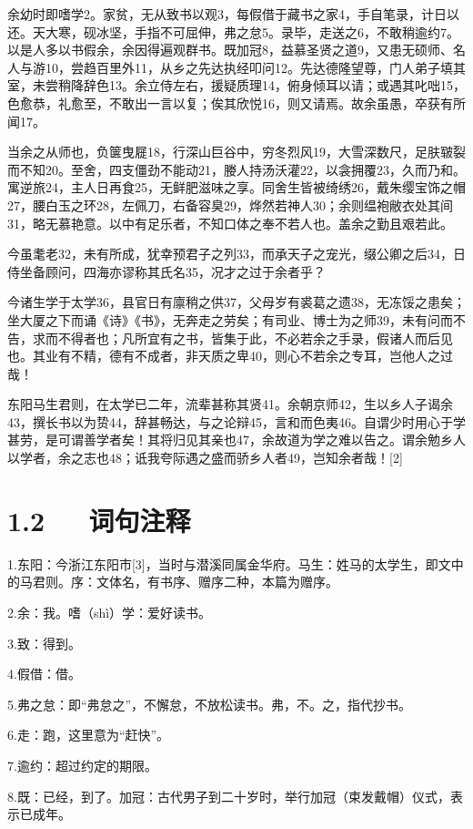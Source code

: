 \documentclass[letterpaper,10pt,english]{sphinxmanual}
\begin{document}
余幼时即嗜学2。家贫，无从致书以观3，每假借于藏书之家4，手自笔录，计日以还。天大寒，砚冰坚，手指不可屈伸，弗之怠5。录毕，走送之6，不敢稍逾约7。以是人多以书假余，余因得遍观群书。既加冠8，益慕圣贤之道9，又患无硕师、名人与游10，尝趋百里外11，从乡之先达执经叩问12。先达德隆望尊，门人弟子填其室，未尝稍降辞色13。余立侍左右，援疑质理14，俯身倾耳以请；或遇其叱咄15，色愈恭，礼愈至，不敢出一言以复；俟其欣悦16，则又请焉。故余虽愚，卒获有所闻17。

当余之从师也，负箧曳屣18，行深山巨谷中，穷冬烈风19，大雪深数尺，足肤皲裂而不知20。至舍，四支僵劲不能动21，媵人持汤沃灌22，以衾拥覆23，久而乃和。寓逆旅24，主人日再食25，无鲜肥滋味之享。同舍生皆被绮绣26，戴朱缨宝饰之帽27，腰白玉之环28，左佩刀，右备容臭29，烨然若神人30；余则缊袍敝衣处其间31，略无慕艳意。以中有足乐者，不知口体之奉不若人也。盖余之勤且艰若此。

今虽耄老32，未有所成，犹幸预君子之列33，而承天子之宠光，缀公卿之后34，日侍坐备顾问，四海亦谬称其氏名35，况才之过于余者乎？

今诸生学于太学36，县官日有廪稍之供37，父母岁有裘葛之遗38，无冻馁之患矣；坐大厦之下而诵《诗》《书》，无奔走之劳矣；有司业、博士为之师39，未有问而不告，求而不得者也；凡所宜有之书，皆集于此，不必若余之手录，假诸人而后见也。其业有不精，德有不成者，非天质之卑40，则心不若余之专耳，岂他人之过哉！

东阳马生君则，在太学已二年，流辈甚称其贤41。余朝京师42，生以乡人子谒余43，撰长书以为贽44，辞甚畅达，与之论辩45，言和而色夷46。自谓少时用心于学甚劳，是可谓善学者矣！其将归见其亲也47，余故道为学之难以告之。谓余勉乡人以学者，余之志也48；诋我夸际遇之盛而骄乡人者49，岂知余者哉！{[}2{]}


\section{1.2   词句注释}
\label{\detokenize{p01_u6563_u6587/_u5b8b_u6fc2-_u9001_u4e1c_u9633_u9a6c_u751f_u5e8f:id4}}
1.东阳：今浙江东阳市{[}3{]}，当时与潜溪同属金华府。马生：姓马的太学生，即文中的马君则。序：文体名，有书序、赠序二种，本篇为赠序。

2.余：我。嗜（shì）学：爱好读书。

3.致：得到。

4.假借：借。

5.弗之怠：即“弗怠之”，不懈怠，不放松读书。弗，不。之，指代抄书。

6.走：跑，这里意为“赶快”。

7.逾约：超过约定的期限。

8.既：已经，到了。加冠：古代男子到二十岁时，举行加冠（束发戴帽）仪式，表示已成年。
\end{document}

